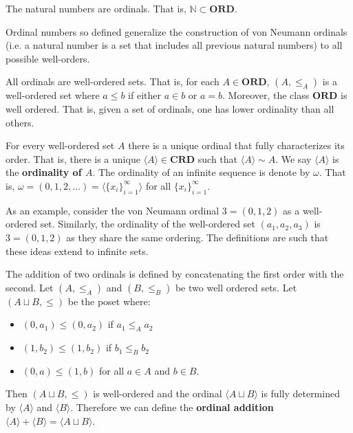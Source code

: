 \documentclass{article}
\newcommand{\marginleft}[1] {\reversemarginpar\marginpar{#1}}
\def\ordinals{\textbf{ORD}}
\def\cardinals{\textbf{CRD}}
\def\ordeq{\sim}
\begin{document}
\begin{prop}
	The natural numbers are ordinals. That is, $\mathbb{N} \subset \ordinals$.
\end{prop}

\begin{remark}
	Ordinal numbers so defined generalize the construction of von Neumann ordinals (i.e. a natural number is a set that includes all previous natural numbers) to all possible well-orders.
\end{remark}

\begin{prop}
	All ordinals are well-ordered sets. That is, for each $A \in \ordinals$, $(A, \leq_A)$ is a well-ordered set where $a \leq b$ if either $a \in b$ or $a = b$. Moreover, the class $\ordinals$ is well ordered. That is, given a set of ordinals, one has lower ordinality than all others.
\end{prop}

\begin{prop}
	For every \marginleft{$\langle A \rangle$, $\omega$} well-ordered set $A$ there is a unique ordinal that fully characterizes its order. That is, there is a unique $\langle A \rangle \in \cardinals$ such that $\langle A \rangle \ordeq A$. We say $\langle A \rangle$ is the \textbf{ordinality of $A$}. The ordinality of an infinite sequence is denote by $\omega$. That is, $\omega = (0, 1, 2, ...) = \langle \{x_i\}_{i=1}^\infty \rangle$ for all $\{x_i\}_{i=1}^\infty$.
\end{prop}

\begin{remark}
	As an example, consider the von Neumann ordinal $3 = (0, 1, 2)$ as a well-ordered set. Similarly, the ordinality of the well-ordered set $(a_1, a_2, a_3)$ is $3 = (0, 1, 2)$ as they share the same ordering. The definitions are such that these ideas extend to infinite sets.
\end{remark}

\begin{defn}
	The addition \marginleft{Ordinal addition: $\langle A \rangle + \langle B \rangle$} of two ordinals is defined by concatenating the first order with the second. Let $(A, \leq_A)$ and $(B, \leq_B)$ be two well ordered sets. Let $(A \sqcup B, \leq)$ be the poset where:
	\begin{itemize}
		\item $(0, a_1) \leq (0, a_2)$ if $a_1 \leq_A a_2$
		\item $(1, b_2) \leq (1, b_2)$ if $b_1 \leq_B b_2$
		\item $(0, a) \leq (1, b)$ for all $a \in A$ and $b \in B$.  	
	\end{itemize}
	Then $(A \sqcup B, \leq)$ is well-ordered and the ordinal $\langle A \sqcup B \rangle$ is fully determined by $\langle A \rangle$ and $\langle B \rangle$. Therefore we can define the \textbf{ordinal addition} $\langle A \rangle + \langle B \rangle =  \langle A \sqcup B \rangle$.
\end{defn}
\end{document}
